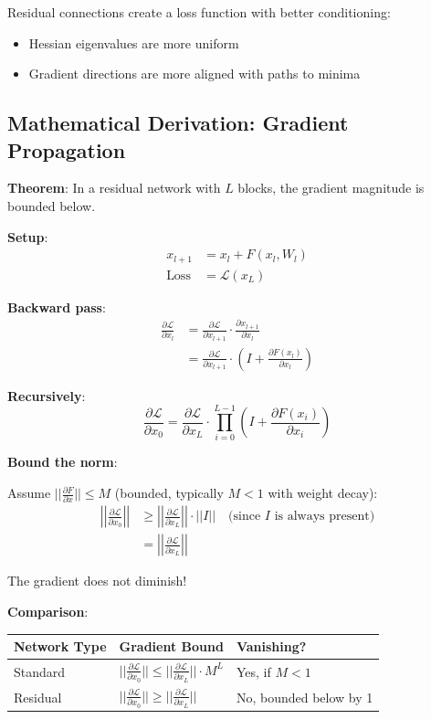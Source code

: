 \documentclass[11pt,oneside]{book}
\begin{document}
Residual connections create a loss function with better conditioning:
\begin{itemize}
\item Hessian eigenvalues are more uniform
\item Gradient directions are more aligned with paths to minima
\end{itemize}

\subsection{Mathematical Derivation: Gradient Propagation}

\textbf{Theorem}: In a residual network with $L$ blocks, the gradient magnitude is bounded below.

\textbf{Setup}:
\begin{align*}
x_{l+1} &= x_l + F(x_l, W_l) \\
\text{Loss} &= \mathcal{L}(x_L)
\end{align*}

\textbf{Backward pass}:
\begin{align*}
\frac{\partial \mathcal{L}}{\partial x_l} &= \frac{\partial \mathcal{L}}{\partial x_{l+1}} \cdot \frac{\partial x_{l+1}}{\partial x_l} \\
&= \frac{\partial \mathcal{L}}{\partial x_{l+1}} \cdot \left(I + \frac{\partial F(x_l)}{\partial x_l}\right)
\end{align*}

\textbf{Recursively}:
\[
\frac{\partial \mathcal{L}}{\partial x_0} = \frac{\partial \mathcal{L}}{\partial x_L} \cdot \prod_{i=0}^{L-1} \left(I + \frac{\partial F(x_i)}{\partial x_i}\right)
\]

\textbf{Bound the norm}:

Assume $||\frac{\partial F}{\partial x}|| \leq M$ (bounded, typically $M < 1$ with weight decay):
\begin{align*}
\left|\left|\frac{\partial \mathcal{L}}{\partial x_0}\right|\right| &\geq \left|\left|\frac{\partial \mathcal{L}}{\partial x_L}\right|\right| \cdot ||I|| \quad \text{(since } I \text{ is always present)} \\
&= \left|\left|\frac{\partial \mathcal{L}}{\partial x_L}\right|\right|
\end{align*}

The gradient does not diminish!

\textbf{Comparison}:

\begin{table}[h]
\centering
\begin{tabular}{lll}
\toprule
\textbf{Network Type} & \textbf{Gradient Bound} & \textbf{Vanishing?} \\
\midrule
Standard & $||\frac{\partial \mathcal{L}}{\partial x_0}|| \leq ||\frac{\partial \mathcal{L}}{\partial x_L}|| \cdot M^L$ & Yes, if $M < 1$ \\
Residual & $||\frac{\partial \mathcal{L}}{\partial x_0}|| \geq ||\frac{\partial \mathcal{L}}{\partial x_L}||$ & No, bounded below by 1 \\
\bottomrule
\end{tabular}
\end{table}
\end{document}

